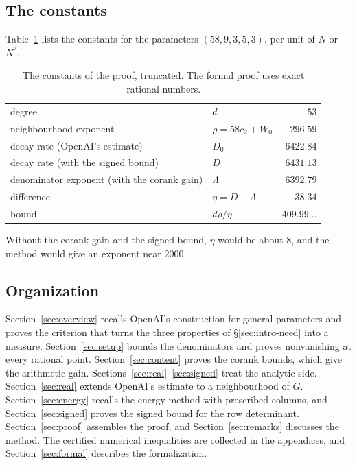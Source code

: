 \documentclass[11pt]{amsart}
\theoremstyle{definition}
\theoremstyle{remark}
\numberwithin{equation}{section}
\begin{document}
\subsection{The constants}
Table~\ref{tab:constants} lists the constants for the parameters $(58,9,3,5,3)$, per unit of $N$ or $N^2$.
\begin{table}[ht]\centering
\begin{tabular}{@{}llr@{}}\toprule
degree & $d$ & $53$\\
neighbourhood exponent & $\rho=58c_2+W_0$ & $296.59$\\
decay rate (OpenAI's estimate) & $D_0$ & $6422.84$\\
decay rate (with the signed bound) & $D$ & $6431.13$\\
denominator exponent (with the corank gain) & $\Lambda$ & $6392.79$\\
difference & $\eta=D-\Lambda$ & $38.34$\\
\midrule
bound & $d\rho/\eta$ & $409.99\ldots$\\\bottomrule
\end{tabular}
\caption{The constants of the proof, truncated. The formal proof uses exact rational numbers.}
\label{tab:constants}\end{table}
Without the corank gain and the signed bound, $\eta$ would be about $8$, and the method would give an
exponent near $2000$.

\subsection{Organization}
Section~\ref{sec:overview} recalls OpenAI's construction for general parameters and proves the criterion
that turns the three properties of \S\ref{sec:intro-need} into a measure. Section~\ref{sec:setup} bounds the
denominators and proves nonvanishing at every rational point. Section~\ref{sec:content} proves the corank
bounds, which give the arithmetic gain. Sections~\ref{sec:real}--\ref{sec:signed} treat the analytic side.
Section~\ref{sec:real} extends OpenAI's estimate to a neighbourhood of $G$. Section~\ref{sec:energy} recalls
the energy method with prescribed columns, and Section~\ref{sec:signed} proves the signed bound for the row
determinant. Section~\ref{sec:proof} assembles the proof, and Section~\ref{sec:remarks} discusses the
method. The certified numerical inequalities are collected in the appendices, and
Section~\ref{sec:formal} describes the formalization.
\end{document}
